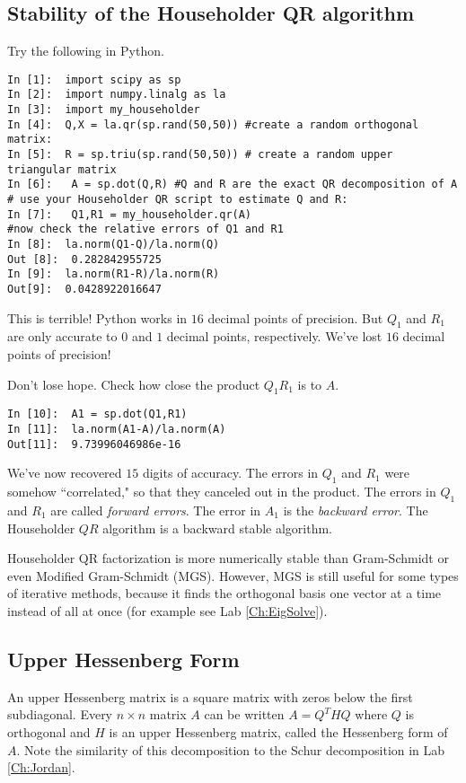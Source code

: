 \subsection*{Stability of the Householder QR algorithm}

Try the following in Python.

\begin{lstlisting}
In [1]:  import scipy as sp
In [2]:  import numpy.linalg as la
In [3]:  import my_householder
In [4]:  Q,X = la.qr(sp.rand(50,50)) #create a random orthogonal matrix:
In [5]:  R = sp.triu(sp.rand(50,50)) # create a random upper triangular matrix
In [6]:   A = sp.dot(Q,R) #Q and R are the exact QR decomposition of A
# use your Householder QR script to estimate Q and R:
In [7]:   Q1,R1 = my_householder.qr(A)
#now check the relative errors of Q1 and R1
In [8]:  la.norm(Q1-Q)/la.norm(Q)
Out [8]:  0.282842955725
In [9]:  la.norm(R1-R)/la.norm(R)
Out[9]:  0.0428922016647
\end{lstlisting}
This is terrible! Python works in $16$ decimal points of precision. But $Q_1$ and $R_1$ are only accurate to $0$ and $1$ decimal points, respectively. We've lost $16$ decimal points of precision!

Don't lose hope. Check how close the product $Q_1 R_1$ is to $A$.
\begin{lstlisting}
In [10]:  A1 = sp.dot(Q1,R1)
In [11]:  la.norm(A1-A)/la.norm(A)
Out[11]:  9.73996046986e-16
\end{lstlisting}
We've now recovered $15$ digits of accuracy. The errors in $Q_1$ and $R_1$ were somehow ``correlated," so that they canceled out in the product. The errors in $Q_1$ and $R_1$ are called \emph{forward errors}. The error in $A_1$ is the \emph{backward error}. The Householder $QR$ algorithm is a backward stable algorithm.

Householder QR factorization is more numerically stable than Gram-Schmidt or even Modified Gram-Schmidt (MGS). However, MGS is still useful for some types of iterative methods, because it finds the orthogonal basis one vector at a time instead of all at once (for example see Lab \ref{Ch:EigSolve}).

\subsection*{Upper Hessenberg Form}

An upper Hessenberg matrix is a square matrix with zeros below the first subdiagonal. Every  $n \times n$ matrix $A$ can be written $A = Q^THQ$ where $Q$ is orthogonal and $H$ is an upper Hessenberg matrix, called the Hessenberg form of $A$. Note the similarity of this decomposition to the Schur decomposition in Lab \ref{Ch:Jordan}. 

